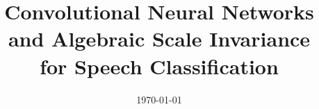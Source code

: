 \documentclass[a4paper]{article}
\begin{document}
\title{Convolutional Neural Networks and Algebraic Scale Invariance \\ for Speech Classification}
\address{Technical University Of Denmark}
\date{\today}

\maketitle








\printbibliography

\appendix

\end{document}
